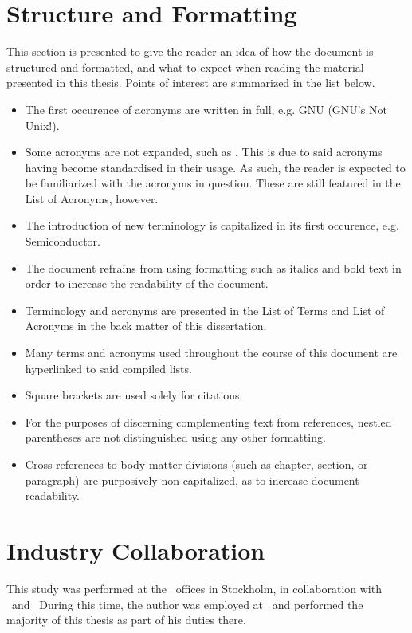 \section*{Structure and Formatting}
\label{sec:preface_structureandformatting}
This section is presented to give the reader an idea of how the document is structured and formatted, and what to expect when reading the material presented in this thesis.
Points of interest are summarized in the list below.
\begin{itemize}[noitemsep]
	\item The first occurence of acronyms are written in full, e.g. GNU (GNU's Not Unix!).
	\item Some acronyms are not expanded, such as \dvttermcpu . This is due to said acronyms having become standardised in their usage. As such, the reader is expected to be familiarized with the acronyms in question. These are still featured in the List of Acronyms, however. 
	\item The introduction of new terminology is capitalized in its first occurence, e.g. Semiconductor.
	\item The document refrains from using formatting such as italics and bold text in order to increase the readability of the document.
	\item Terminology and acronyms are presented in the List of Terms and List of Acronyms in the back matter of this dissertation.
	\item Many terms and acronyms used throughout the course of this document are hyperlinked to said compiled lists.
	\item Square brackets are used solely for citations.
	\item For the purposes of discerning complementing text from references, nestled parentheses are not distinguished using any other formatting.
	\item Cross-references to body matter divisions (such as chapter, section, or paragraph) are purposively non-capitalized, as to increase document readability.
\end{itemize}

\section*{Industry Collaboration}
\label{sec:preface_industrycollaboration}
This study was performed at the \dvttermintel\ offices in Stockholm, in collaboration with \dvttermintel\ and \dvttermwindriver\
During this time, the author was employed at \dvttermintel\ and performed the majority of this thesis as part of his duties there.

